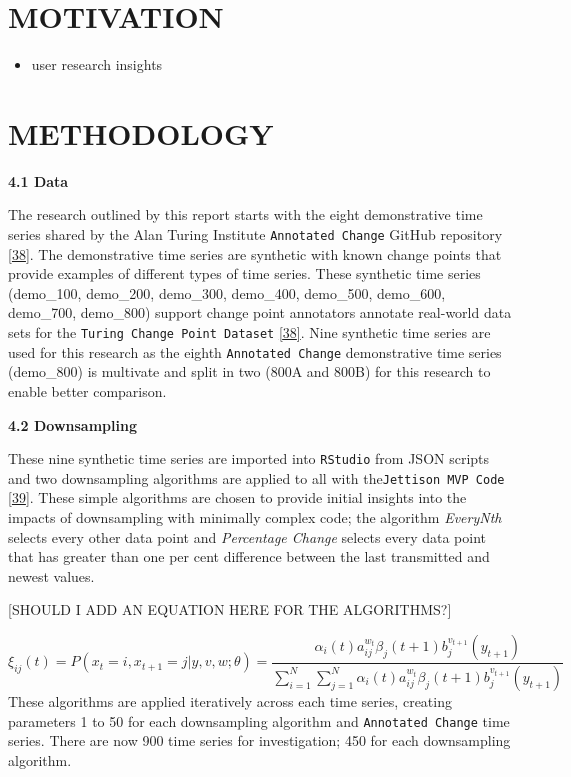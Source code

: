 \documentclass{article}
\providecommand{\tightlist}{%
  \setlength{\itemsep}{0pt}\setlength{\parskip}{0pt}}
\begin{document}
\hypertarget{motivation}{%
\section{MOTIVATION}\label{motivation}}

\label{sec:headings}

\begin{itemize}
\tightlist
\item
  user research insights
\end{itemize}

\hypertarget{methodology}{%
\section{METHODOLOGY}\label{methodology}}

\label{sec:headings}

\textbf{4.1 Data}

The research outlined by this report starts with the eight demonstrative
time series shared by the Alan Turing Institute
\texttt{Annotated\ Change} GitHub repository
\protect\hyperlink{ref-ATIChangePoint}{{[}38{]}}. The demonstrative time
series are synthetic with known change points that provide examples of
different types of time series. These synthetic time series (demo\_100,
demo\_200, demo\_300, demo\_400, demo\_500, demo\_600, demo\_700,
demo\_800) support change point annotators annotate real-world data sets
for the \texttt{Turing\ Change\ Point\ Dataset}
\protect\hyperlink{ref-ATIChangePoint}{{[}38{]}}. Nine synthetic time
series are used for this research as the eighth
\texttt{Annotated\ Change} demonstrative time series (demo\_800) is
multivate and split in two (800A and 800B) for this research to enable
better comparison.

\textbf{4.2 Downsampling}

These nine synthetic time series are imported into \texttt{RStudio} from
JSON scripts and two downsampling algorithms are applied to all with
the\texttt{Jettison\ MVP\ Code}
\protect\hyperlink{ref-Jettison}{{[}39{]}}. These simple algorithms are
chosen to provide initial insights into the impacts of downsampling with
minimally complex code; the algorithm \emph{EveryNth} selects every
other data point and \emph{Percentage Change} selects every data point
that has greater than one per cent difference between the last
transmitted and newest values.

{[}SHOULD I ADD AN EQUATION HERE FOR THE ALGORITHMS?{]}

\[
\xi _{ij}(t)=P(x_{t}=i,x_{t+1}=j|y,v,w;\theta)= {\frac {\alpha _{i}(t)a^{w_t}_{ij}\beta _{j}(t+1)b^{v_{t+1}}_{j}(y_{t+1})}{\sum _{i=1}^{N} \sum _{j=1}^{N} \alpha _{i}(t)a^{w_t}_{ij}\beta _{j}(t+1)b^{v_{t+1}}_{j}(y_{t+1})}}
\] These algorithms are applied iteratively across each time series,
creating parameters 1 to 50 for each downsampling algorithm and
\texttt{Annotated\ Change} time series. There are now 900 time series
for investigation; 450 for each downsampling algorithm.
\end{document}
